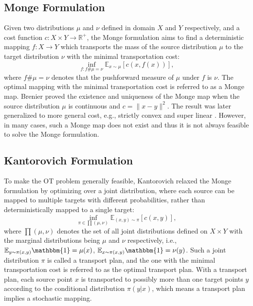\documentclass[runningheads]{llncs}
\begin{document}
\subsection{Monge Formulation}

Given two distributions $\mu$ and $\nu$ defined in domain $X$ and $Y$ respectively, and a cost function $c: X \times Y \rightarrow \mathbb{R}^+$, the Monge formulation aims to find a deterministic mapping $f: X \rightarrow Y$ which transports the mass of the source distribution $\mu$ to the target distribution $\nu$ with the minimal transportation cost:
\begin{equation}
\label{monge_formulation}
\inf_{f: f\#\mu = \nu} \mathbb{E}_{x \sim \mu} [c(x,f(x))],
\end{equation}
where $f\#\mu = \nu$ denotes that the pushforward measure of $\mu$ under $f$ is $\nu$. The optimal mapping with the minimal transportation cost is referred to as a Monge map. Brenier \cite{brenier1991polar} proved the existence and uniqueness of the Monge map when the source distribution $\mu$ is continuous and $c=\|x-y\|^2$. The result was later generalized to more general cost, e.g., strictly convex and super linear \cite{ot_applymath}. However, in many cases, such a Monge map does not exist \cite{large-scale} and thus it is not always feasible to solve the Monge formulation.

\subsection{Kantorovich Formulation}

To make the OT problem generally feasible, Kantorovich \cite{kantorovich} relaxed the Monge formulation by optimizing over a joint distribution, where each source can be mapped to multiple targets with different probabilities, rather than deterministically mapped to a single target:
\begin{equation}
\label{kantorovich_formulation}
\inf_{\pi \in \prod(\mu, \nu)} \mathbb{E}_{(x,y) \sim \pi} [c(x,y)],
\end{equation}
where $\prod(\mu, \nu)$ denotes the set of all joint distributions defined on $X \times Y$ with the marginal distributions being $\mu$ and $\nu$ respectively, i.e., $\mathbb{E}_{y \sim \pi(x, y)} \mathbbm{1} = \mu(x)$, $\mathbb{E}_{x \sim \pi(x, y)} \mathbbm{1} = \nu(y)$. Such a joint distribution $\pi$ is called a transport plan, and the one with the minimal transportation cost is referred to as the optimal transport plan. With a transport plan, each source point $x$ is transported to possibly more than one target points $y$ according to the conditional distribution $\pi(y|x)$, which means a transport plan implies a stochastic mapping. 
\end{document}
